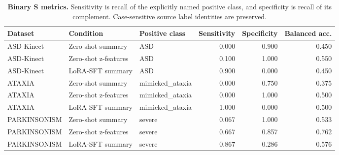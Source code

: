 \begin{table}[H]
\centering
\caption{\textbf{Binary S metrics.} Sensitivity is recall of the explicitly named positive class, and specificity is recall of its complement. Case-sensitive source label identities are preserved.}
\label{tab:binary_metrics}
\small
\begin{adjustbox}{max width=\textwidth}
\begin{tabular}{lllrrr}
\toprule
Dataset & Condition & Positive class & Sensitivity & Specificity & Balanced acc. \\
\midrule
ASD-Kinect & Zero-shot summary & ASD & 0.000 & 0.900 & 0.450 \\
ASD-Kinect & Zero-shot z-features & ASD & 0.100 & 1.000 & 0.550 \\
ASD-Kinect & LoRA-SFT summary & ASD & 0.900 & 0.000 & 0.450 \\
ATAXIA & Zero-shot summary & mimicked\_ataxia & 0.000 & 0.750 & 0.375 \\
ATAXIA & Zero-shot z-features & mimicked\_ataxia & 0.000 & 1.000 & 0.500 \\
ATAXIA & LoRA-SFT summary & mimicked\_ataxia & 1.000 & 0.000 & 0.500 \\
PARKINSONISM & Zero-shot summary & severe & 0.067 & 1.000 & 0.533 \\
PARKINSONISM & Zero-shot z-features & severe & 0.667 & 0.857 & 0.762 \\
PARKINSONISM & LoRA-SFT summary & severe & 0.867 & 0.286 & 0.576 \\
\bottomrule
\end{tabular}
\end{adjustbox}
\end{table}
